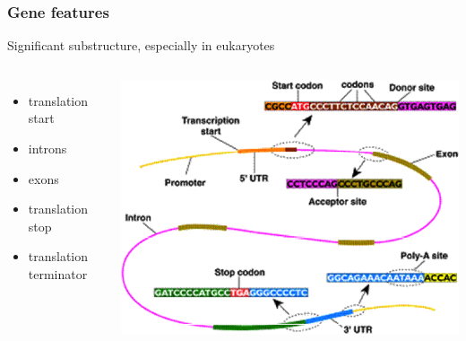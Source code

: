 
%
\begin{frame}
  \frametitle{Gene features}
  Significant substructure, especially in eukaryotes
  \begin{columns}[T] 
      \begin{itemize}
        \item translation start
        \item introns
        \item exons
        \item translation stop
        \item translation terminator
      \end{itemize}
      \includegraphics[width=\textwidth]{images/gene_feature}
  \end{columns}    
\end{frame}

